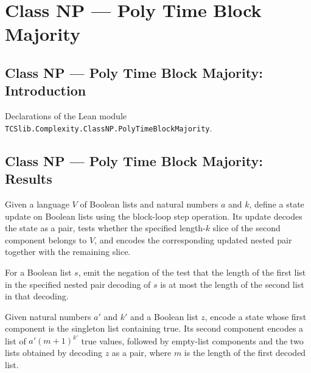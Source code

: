 \section{Class NP --- Poly Time Block Majority}
\subsection*{Class NP --- Poly Time Block Majority: Introduction}

Declarations of the Lean module \texttt{TCSlib.Complexity.ClassNP.PolyTimeBlockMajority}.

\subsection*{Class NP --- Poly Time Block Majority: Results}

\begin{definition}
\label{Complexity.majStep}
\leanok
{}
Given a language $V$ of Boolean lists and natural numbers $a$ and $k$, define a state
update on Boolean lists using the block-loop step operation. Its update decodes the
state as a pair, tests whether the specified length-$k$ slice of the second component
belongs to $V$, and encodes the corresponding updated nested pair together with the
remaining slice.
\end{definition}

\begin{definition}
\label{Complexity.majEmit}
\leanok
{}
For a Boolean list $s$, emit the negation of the test that the length of the first list
in the specified nested pair decoding of $s$ is at most the length of the second list in
that decoding.
\end{definition}

\begin{definition}
\label{Complexity.majInit}
\leanok
{}
Given natural numbers $a'$ and $k'$ and a Boolean list $z$, encode a state whose first
component is the singleton list containing true. Its second component encodes a list of
$a' (m+1)^{k'}$ true values, followed by empty-list components and the two lists
obtained by decoding $z$ as a pair, where $m$ is the length of the first decoded list.
\end{definition}

